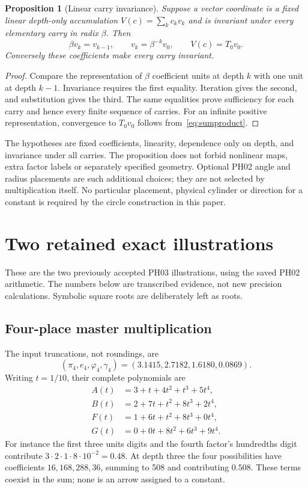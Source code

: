 \documentclass[11pt,a4paper]{article}
\newtheorem{proposition}[theorem]{Proposition}
\begin{document}
\begin{proposition}[Linear carry invariance]
Suppose a vector coordinate is a fixed linear depth-only accumulation $V(c)=\sum_kc_kv_k$ and is invariant under every elementary carry in radix $\beta$. Then
\begin{equation}
 \beta v_k=v_{k-1},\qquad v_k=\beta^{-k}v_0,\qquad
 V(c)=T_0v_0.
 \label{eq:carrylinear}
\end{equation}
Conversely these coefficients make every carry invariant.
\end{proposition}
\begin{proof}
Compare the representation of $\beta$ coefficient units at depth $k$ with one unit at depth $k-1$. Invariance requires the first equality. Iteration gives the second, and substitution gives the third. The same equalities prove sufficiency for each carry and hence every finite sequence of carries. For an infinite positive representation, convergence to $T_0v_0$ follows from~\eqref{eq:sumproduct}.
\end{proof}
The hypotheses are fixed coefficients, linearity, dependence only on depth, and invariance under all carries. The proposition does not forbid nonlinear maps, extra factor labels or separately specified geometry. Optional PH02 angle and radius placements are such additional choices; they are not selected by multiplication itself. No particular placement, physical cylinder or direction for a constant is required by the circle construction in this paper.

\section{Two retained exact illustrations}
\label{sec:examples}
These are the two previously accepted PH03 illustrations, using the saved PH02 arithmetic. The numbers below are transcribed evidence, not new precision calculations. Symbolic square roots are deliberately left as roots.

\subsection{Four-place master multiplication}
The input truncations, not roundings, are
\begin{equation}
 (\pi_4,e_4,\varphi_4,\gamma_4)=(3.1415,2.7182,1.6180,0.0869).
 \label{eq:fourinputs}
\end{equation}
Writing $t=1/10$, their complete polynomials are
\begin{equation}
\begin{aligned}
 A(t)&=3+t+4t^2+t^3+5t^4,\\
 B(t)&=2+7t+t^2+8t^3+2t^4,\\
 F(t)&=1+6t+t^2+8t^3+0t^4,\\
 G(t)&=0+0t+8t^2+6t^3+9t^4.
\end{aligned}
\label{eq:polynomials}
\end{equation}
For instance the first three units digits and the fourth factor's hundredths digit contribute $3\cdot2\cdot1\cdot8\cdot10^{-2}=0.48$. At depth three the four possibilities have coefficients $16,168,288,36$, summing to 508 and contributing $0.508$. These terms coexist in the sum; none is an arrow assigned to a constant.
\end{document}
